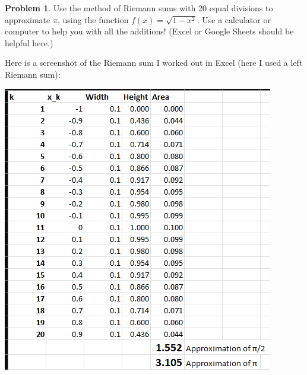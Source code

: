 \documentclass[11pt,oneside]{amsart}
\theoremstyle{definition}
\newtheorem{problem}{Problem}
\begin{document}
    \begin{problem}
        Use the method of Riemann sums with 20 equal divisions to approximate $\pi$, using the function $f(x)=\sqrt{1-x^2}$. Use a calculator or computer to help you with all the additions! (Excel or Google Sheets should be helpful here.)
    \end{problem}
    \begin{solution}
        Here is a screenshot of the Riemann sum I worked out in Excel (here I used a left Riemann sum):
        \begin{center}
        \includegraphics[width=0.5\linewidth]{riemann_sum.png}
        \end{center}
    \end{solution}
\end{document}
